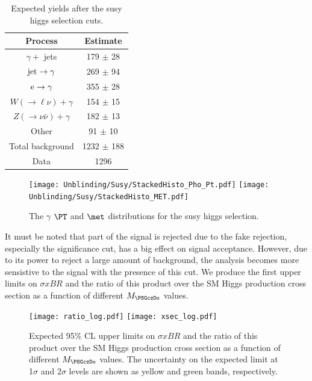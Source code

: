 \begin{table}[!hp]
\center
{
\begin{tabular}{|c|c|}
\hline
Process & Estimate \\
\hline
$\gamma +$ jets                          & 179 $\pm$ 28 \\
${\rm jet}\rightarrow \gamma$        & 269 $\pm$ 94 \\
${\rm e} \rightarrow \gamma$         & 355 $\pm$ 28 \\
$W(\to \ell\nu)+\gamma $                 &  154 $\pm$ 15 \\
$Z( \to \nu \bar{\nu} )+\gamma    $      &  182 $\pm$ 13 \\
Other                                    &  91 $\pm$  10 \\
\hline
Total background                       &   1232 $\pm$ 188 \\
\hline
Data                                   &  1296  \\
\hline
\end{tabular}
\caption{Expected yields after the susy higgs selection cuts.}
\label{tab:exoh}
}
\end{table}

\begin{figure}[!hp]
\centering
{\label{fig:QCDPt}\texttt{[image: Unblinding/Susy/StackedHisto\_Pho\_Pt.pdf]}}
{\label{fig:QCDMET}\texttt{[image: Unblinding/Susy/StackedHisto\_MET.pdf]}}
\caption{The $\gamma$ $\PT$ and $\met$ distributions for the susy higgs selection. }
\label{fig:exoh}
\end{figure}

It must be noted that part of the signal is rejected due to the fake \met rejection, especially the \met significance cut, has a big effect on signal acceptance. However, due to its power to reject a large amount of background, the analysis becomes more sensistive to the signal with the presence of this cut. We produce the first  upper limits on $\sigma x BR$ and the ratio of this product over the SM Higgs production cross section as a function of different $M_{\PSGczDo}$ values.

\begin{figure}[!hp]
\centering
{\texttt{[image: ratio\_log.pdf]}}
{\texttt{[image: xsec\_log.pdf]}}
\caption{ Expected 95\% CL upper limits on $\sigma x BR$ and the ratio of this product over the SM Higgs production cross section as a function of different $M_{\PSGczDo}$ values. The uncertainty on the expected limit at 1$\sigma$ and 2$\sigma$ levels are shown as yellow and green bands, respectively. }
\label{fig:limit_higgs}    
\end{figure}


